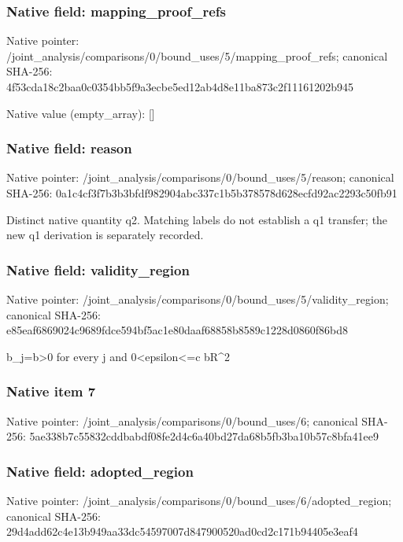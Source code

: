 \documentclass[10pt,a4paper]{article}
\begin{document}
\subsubsection{Native field: mapping\_\allowbreak{}proof\_\allowbreak{}refs}
Native pointer: /joint\_\allowbreak{}analysis/comparisons/0/bound\_\allowbreak{}uses/5/mapping\_\allowbreak{}proof\_\allowbreak{}refs; canonical SHA-256: 4f53cda18c2baa0c0354bb5f9a3ecbe5ed12ab4d8e11ba873c2f11161202b945

Native value (empty\_\allowbreak{}array): []

\subsubsection{Native field: reason}
Native pointer: /joint\_\allowbreak{}analysis/comparisons/0/bound\_\allowbreak{}uses/5/reason; canonical SHA-256: 0a1c4cf3f7b3b3bfdf982904abc337c1b5b378578d628ecfd92ac2293c50fb91

\begingroup\raggedright\sloppy Distinct native quantity q2. Matching labels do not establish a q1 transfer;\allowbreak{} the new q1 derivation is separately recorded.\par\endgroup

\subsubsection{Native field: validity\_\allowbreak{}region}
Native pointer: /joint\_\allowbreak{}analysis/comparisons/0/bound\_\allowbreak{}uses/5/validity\_\allowbreak{}region; canonical SHA-256: e85eaf6869024c9689fdce594bf5ac1e80daaf68858b8589c1228d0860f86bd8

\begingroup\raggedright\sloppy b\_\allowbreak{}j=\allowbreak{}b>0 for every j and 0<epsilon<=\allowbreak{}c bR\textasciicircum{}2\par\endgroup

\subsubsection{Native item 7}
Native pointer: /joint\_\allowbreak{}analysis/comparisons/0/bound\_\allowbreak{}uses/6; canonical SHA-256: 5ae338b7c55832cddbabdf08fe2d4c6a40bd27da68b5fb3ba10b57c8bfa41ee9

\subsubsection{Native field: adopted\_\allowbreak{}region}
Native pointer: /joint\_\allowbreak{}analysis/comparisons/0/bound\_\allowbreak{}uses/6/adopted\_\allowbreak{}region; canonical SHA-256: 29d4add62c4e13b949aa33dc54597007d847900520ad0cd2c171b94405e3eaf4
\end{document}
